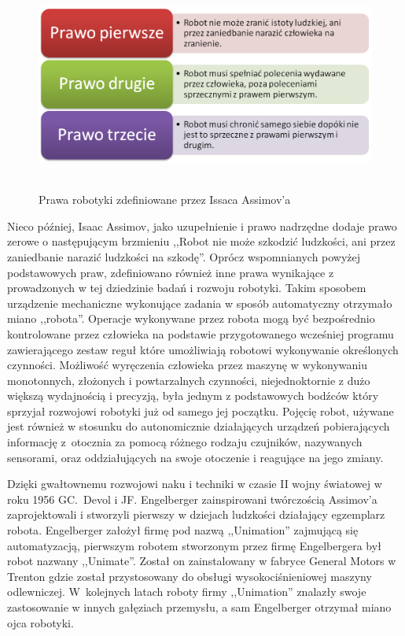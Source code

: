 \begin{figure}[h!]
	\centering
	\includegraphics[height=70mm]{../images/ch01/assimov_laws.png}
	\caption{Prawa robotyki zdefiniowane przez Issaca Assimov'a}
	\label{fig:Assimov_Laws}
\end{figure}

Nieco później, Isaac Assimov, jako uzupełnienie i prawo nadrzędne dodaje prawo
zerowe o następującym brzmieniu ,,Robot nie może szkodzić ludzkości, ani przez
zaniedbanie narazić ludzkości na szkodę''\cite{website:robotyka-pl}. Oprócz
wspomnianych powyżej podstawowych praw, zdefiniowano również inne prawa
wynikające z prowadzonych w tej dziedzinie badań i rozwoju robotyki.
\newpage
Takim sposobem urządzenie mechaniczne wykonujące zadania w sposób automatyczny
otrzymało miano ,,robota''.\cite{website:asimo-pl} Operacje wykonywane przez
robota mogą być bezpośrednio kontrolowane przez człowieka na podstawie przygotowanego wcześniej
programu zawierającego zestaw reguł które umożliwiają robotowi wykonywanie
określonych czynności. Możliwość wyręczenia człowieka przez maszynę w
wykonywaniu monotonnych, złożonych i powtarzalnych czynności, niejednoktornie
z dużo większą wydajnością i precyzją, była jednym z podstawowych bodźców
który sprzyjał rozwojowi robotyki już od samego jej początku. Pojęcię robot,
używane jest również w stosunku do autonomicznie działających urządzeń
pobierających informację z~otocznia za pomocą różnego rodzaju czujników,
nazywanych sensorami, oraz oddziałujących na swoje otoczenie i reagujące na
jego zmiany. 

Dzięki gwałtownemu rozwojowi naku i techniki w czasie II wojny światowej w roku
1956 GC.~Devol i JF. Engelberger zainspirowani twórczością Assimov'a zaprojektowali i
stworzyli pierwszy w dziejach ludzkości działający egzemplarz robota\cite{website:robotyka-pl}.
Engelberger założył firmę pod nazwą ,,Unimation'' zajmującą się automatyzacją,
pierwszym robotem stworzonym przez firmę Engelbergera był robot nazwany
,,Unimate''. Został on zainstalowany w fabryce General Motors w Trenton gdzie
został przystosowany do obsługi wysokociśnieniowej maszyny odlewniczej.
W~kolejnych latach roboty firmy ,,Unimation'' znalazły swoje zastosowanie w
innych gałęziach przemysłu, a sam Engelberger otrzymał miano ojca
robotyki.\cite{website:robotyka-pl}


